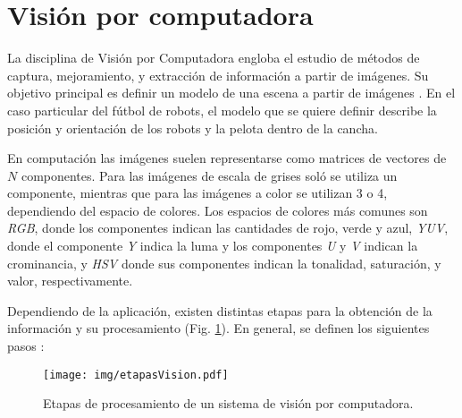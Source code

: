 
\section{Visión por computadora}

\label{mt_visionComputadora}

La disciplina de Visión por Computadora engloba el estudio de métodos de
captura, mejoramiento, y extracción de información a partir de imágenes. Su
objetivo principal es definir un modelo de una escena a partir de
imágenes \cite{cvLinda2001}. En el caso particular del fútbol de robots, el
modelo que se quiere definir describe la posición y orientación de los robots y
la pelota dentro de la cancha.

En computación las imágenes suelen representarse como matrices de vectores de
$N$ componentes. Para las imágenes de escala de grises soló se utiliza un
componente, mientras que para las imágenes a color se utilizan 3 o 4,
dependiendo del espacio de colores. Los espacios de colores más comunes son
\emph{RGB}, donde los componentes indican las cantidades de rojo, verde y
azul, \emph{YUV}, donde el componente \emph{Y} indica la luma y los
componentes \emph{U} y \emph{V} indican la crominancia, y \emph{HSV} donde sus
componentes indican la tonalidad, saturación, y valor, respectivamente.

Dependiendo de la aplicación, existen distintas etapas para la obtención de la
información y su procesamiento (Fig. \ref{etapasVision}). En general, se definen los
siguientes pasos \cite{digitalImageProcessing2ed,wikiCV}:

\begin{figure}[h]

	\centering
	\texttt{[image: img/etapasVision.pdf]}
	\caption{Etapas de procesamiento de un sistema de visión por
	computadora.}

	\label{etapasVision}

\end{figure}

